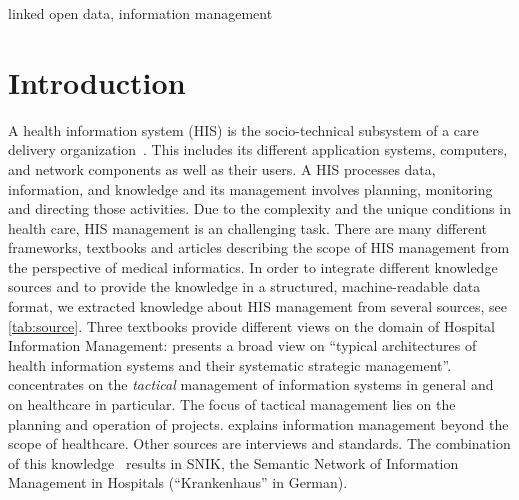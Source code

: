 \documentclass[conference]{IEEEtran}
\newcommand{\citet}{\cite}%
\newcommand{\citep}{\cite}%
\begin{document}

\begin{IEEEkeywords}
linked open data, information management
\end{IEEEkeywords}

\section{Introduction}
A health information system (HIS) is the socio-technical subsystem of a care delivery organization~\citep{bb}.
This includes its different application systems, computers, and network components as well as their users.
A HIS processes data, information, and knowledge and its management involves planning, monitoring and directing those activities.
Due to the complexity and the unique conditions in health care, HIS management is an challenging task.
There are many different frameworks, textbooks and articles describing the scope of HIS management from the perspective of medical informatics.
In order to integrate different knowledge sources and to provide the knowledge in a structured, machine-readable data format, we extracted knowledge about HIS management from several sources, see \cref{tab:source}.
Three textbooks provide different views on the domain of Hospital Information Management:
\citet{bb} presents a broad view on \enquote{typical architectures of health information systems and their systematic strategic management}.
\citep{ob} concentrates on the \emph{tactical} management of information systems in general and on healthcare in particular.
The focus of tactical management lies on the planning and operation of projects.
\citet{he} explains information management beyond the scope of healthcare.
Other sources are interviews and standards.
%
The combination of this knowledge~\citep{semantischesnetz,domaene,approachtosupport} results in SNIK, the Semantic Network of Information Management in Hospitals (\enquote{Krankenhaus} in German).
\end{document}
